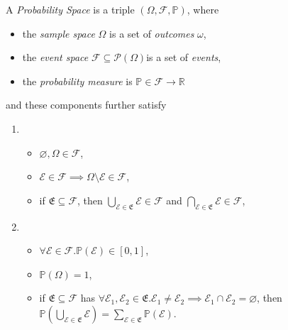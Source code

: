 		\begin{definition}
			\label{def:probabilityspace}
			A \emph{Probability Space} is a triple $(\Omega, \mathcal{F}, \mathbb{P})$, where
			\begin{itemize}
				\item the \emph{sample space} $\Omega$ is a set of \emph{outcomes} $\omega$,
				\item the \emph{event space} $\mathcal{F}\subseteq\mathcal{P}(\Omega)$\footnotemark is a set of \emph{events},
				\item the \emph{probability measure} is $\mathbb{P} \in \mathcal{F} \rightarrow \mathbb{R}$
			\end{itemize}
			and these components further satisfy
			\begin{enumerate}[$(i)$]
				\item{
					\begin{itemize}
						\item $\varnothing, \Omega \in \mathcal{F}$,
						\item $\mathcal{E} \in \mathcal{F} \implies \Omega \setminus \mathcal{E} \in \mathcal{F}$,
						\item if $\mathfrak{E} \subseteq \mathcal{F}$, then $\bigcup_{\mathcal{E} \in 
						\mathfrak{E}} \mathcal{E} \in \mathcal{F}$ and $\bigcap_{\mathcal{E} \in 
						\mathfrak{E}} \mathcal{E} \in \mathcal{F}$\footnotemark,
					\end{itemize}
				}
				\item{
					\begin{itemize}
						\item $\forall \mathcal{E} \in \mathcal{F}. \mathbb{P}(\mathcal{E}) \in [0,1]$,
						\item $\mathbb{P}(\Omega) = 1$,
						\item if $\mathfrak{E} \subseteq \mathcal{F}$ has $\forall \mathcal{E}_1, 
						\mathcal{E}_2 \in \mathfrak{E}. \mathcal{E}_1 \neq \mathcal{E}_2 \implies
						\mathcal{E}_1 \cap \mathcal{E}_2 = \varnothing$, then 
						$\mathbb{P}(\bigcup_{\mathcal{E} \in \mathfrak{E}} \mathcal{E}) = 
						\sum_{\mathcal{E} \in \mathfrak{E}} \mathbb{P}(\mathcal{E})$.
					\end{itemize}
				}
			\end{enumerate}
		\end{definition}
		
